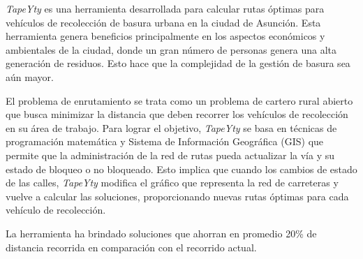 \begin{resumen}
\textit{TapeYty} es una herramienta desarrollada para calcular rutas óptimas para vehículos de recolección de basura urbana en la ciudad de Asunción. Esta herramienta genera beneficios principalmente en los aspectos económicos y ambientales de la ciudad, donde un gran número de personas genera una alta generación de residuos. Esto hace que la complejidad de la gestión de basura sea aún mayor.

El problema de enrutamiento se trata como un problema de cartero rural abierto que busca minimizar la distancia que deben recorrer los vehículos de recolección en su área de trabajo. Para lograr el objetivo, \textit{TapeYty} se basa en técnicas de programación matemática y Sistema de Información Geográfica (GIS) que permite que la administración de la red de rutas pueda actualizar la vía y su estado de bloqueo o no bloqueado. Esto implica que cuando los cambios de estado de las calles, \textit{TapeYty} modifica el gráfico que representa la red de carreteras y vuelve a calcular las soluciones, proporcionando nuevas rutas óptimas para cada vehículo de recolección.

La herramienta ha brindado soluciones que ahorran en promedio 20\% de distancia recorrida en comparación con el recorrido actual.
\end{resumen}